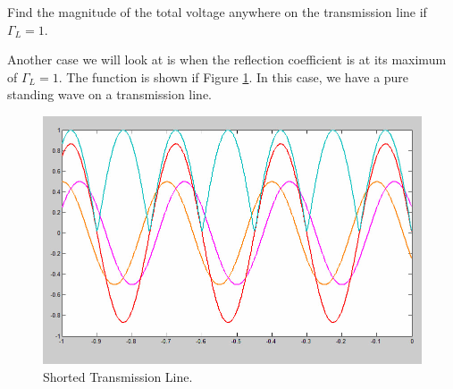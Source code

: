 \documentclass{ximera}
\begin{document}
\begin{example}

Find the magnitude of the total voltage anywhere on the transmission line if $\Gamma_L=1$.

\begin{explanation}
Another case we will look at is when
the reflection coefficient is at its maximum of $\Gamma_L =1$. The
function is shown if Figure \ref{fig:SWStanding}. In this case, we have a pure standing wave on a transmission line.


\begin{figure}[htbp]
\begin{center}
\includegraphics[scale=0.3]{../jpg/shortedline.jpg}
\end{center}
\caption{Shorted Transmission Line.}
\label{fig:SWStanding}
\end{figure}

\end{explanation}
\end{example}
\end{document}
